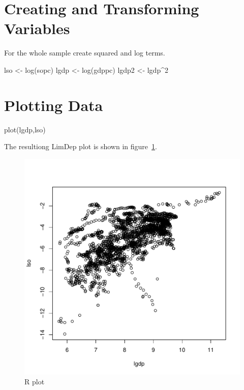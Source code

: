 \documentclass[landscape,letterpaper,9pt]{article}
\begin{document}
\section{Creating and Transforming Variables}
For the whole sample create squared and log terms.
\begin{CVerbatim}
lso <- log(sopc)
lgdp <- log(gdppc)
lgdp2 <- lgdp^2
\end{CVerbatim}



\section{Plotting Data}
\begin{CVerbatim}
plot(lgdp,lso)
\end{CVerbatim}
The resultiong LimDep plot is shown in
figure~\ref{fig:aee_progroup}.

\begin{figure}
  \begin{center}
    \includegraphics[width=6.5in]{aee_panel_exer_limall.pdf}
  \end{center}
  \caption{R plot \label{fig:aee_progroup}}
\end{figure}

\clearpage
\end{document}
